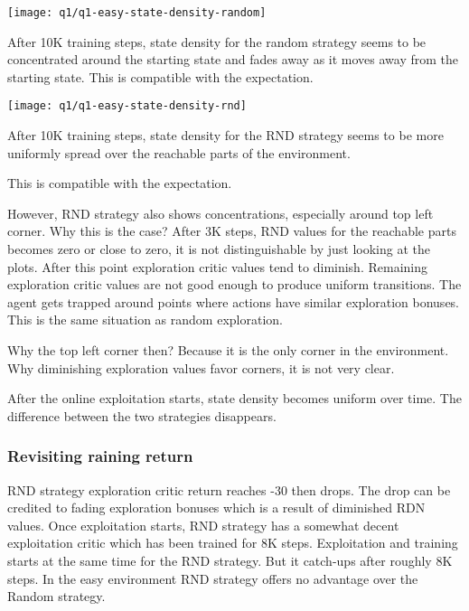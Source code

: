 \documentclass[11pt]{article}
\begin{document}
    \hspace*{-0.6in}
    \texttt{[image: q1/q1-easy-state-density-random]}

    After 10K training steps, state density for the random strategy seems to be concentrated around the starting state and fades away as it moves away from the starting state.
    This is compatible with the expectation.

    \hspace*{-0.6in}
    \texttt{[image: q1/q1-easy-state-density-rnd]}

    After 10K training steps, state density for the RND strategy seems to be more uniformly spread over the reachable parts of the environment.

    This is compatible with the expectation.

    However, RND strategy also shows concentrations, especially around top left corner.
    Why this is the case?
    After 3K steps, RND values for the reachable parts becomes zero or close to zero, it is not distinguishable by just looking at the plots.
    After this point exploration critic values tend to diminish.
    Remaining exploration critic values are not good enough to produce uniform transitions.
    The agent gets trapped around points where actions have similar exploration bonuses.
    This is the same situation as random exploration.

    Why the top left corner then?
    Because it is the only corner in the environment.
    Why diminishing exploration values favor corners, it is not very clear.

    After the online exploitation starts, state density becomes uniform over time.
    The difference between the two strategies disappears.

    \subsubsection*{Revisiting raining return}

    RND strategy exploration critic return reaches -30 then drops.
    The drop can be credited to fading exploration bonuses which is a result of diminished RDN values.
    Once exploitation starts, RND strategy has a somewhat decent exploitation critic which has been trained for 8K steps.
    Exploitation and training starts at the same time for the RND strategy.
    But it catch-ups after roughly 8K steps.
    In the easy environment RND strategy offers no advantage over the Random strategy.
\end{document}
